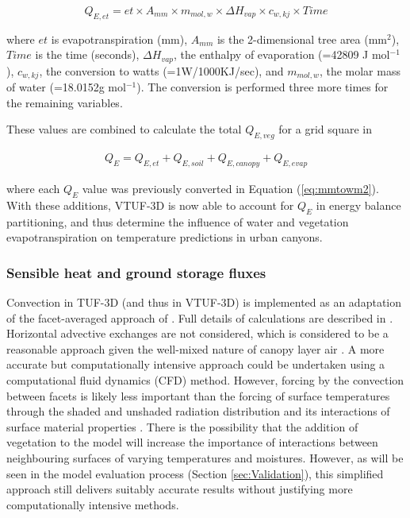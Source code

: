 \documentclass[final,3p,times,authoryear]{elsarticle}
\begin{document}
\begin{equation}\label{eq:mmtowm2} 
  Q_{E,et} = et \times A _{mm} \times m_{mol,w} \times \Delta H_{vap} \times c_{w,kj} \times Time  
\end{equation} 
 
where $et$ is evapotranspiration (mm), $A _{mm}$ is the 2-dimensional tree area (mm$^{2}$), $Time$ is the time (seconds), $\Delta H_{vap}$, the enthalpy of evaporation (=42809 J mol$^{-1}$), $c_{w,kj}$, the conversion to watts (=1W/1000KJ/sec), and $m_{mol,w}$, the molar mass of water (=18.0152g mol$^{-1}$). The conversion is performed three more times for the remaining variables.

These values are combined to calculate the total $Q_{E,veg}$ for a grid square in 


\begin{equation}\label{eq:lefromet} 
\begin{aligned}
Q_{E} = Q_{E,et} + Q_{E,soil} + Q_{E,canopy} + Q_{E,evap} 
\end{aligned}
\end{equation}

where each $Q_{E}$ value was previously converted in Equation (\ref{eq:mmtowm2}). With these additions, VTUF-3D is now able to account for $Q_{E}$ in energy balance partitioning, and thus determine the influence of water and vegetation evapotranspiration on temperature predictions in urban canyons.


\subsubsection{Sensible heat and ground storage fluxes}\label{sec:convection} 
Convection in TUF-3D (and thus in VTUF-3D) is implemented as an adaptation of the facet-averaged approach of \cite{Masson2000}. Full details of calculations are described in \cite{Krayenhoff2007}. Horizontal advective exchanges are not considered, which is considered to be a reasonable approach given the well-mixed nature of canopy layer air \citep{Krayenhoff2007}. A more accurate but computationally intensive approach could be undertaken using a computational fluid dynamics (CFD) method. However, forcing by the convection between facets is likely less important than the forcing of surface temperatures through the shaded and unshaded radiation distribution and its interactions of surface material properties \citep{Krayenhoff2007}. There is the possibility that the addition of vegetation to the model will increase the importance of interactions between neighbouring surfaces of varying temperatures and moistures. However, as will be seen in the model evaluation process (Section \ref{sec:Validation}), this simplified approach still delivers suitably accurate results without justifying more computationally intensive methods. 
\end{document}
